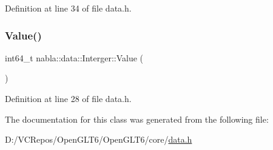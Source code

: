 Definition at line 34 of file data.\+h.

\mbox{\label{classnabla_1_1data_1_1_interger_a3bbd8bd6b1e1815820e91624ec3e8b15}} 
\subsubsection{\texorpdfstring{Value()}{Value()}}
{\footnotesize\ttfamily int64\+\_\+t nabla\+::data\+::\+Interger\+::\+Value (\begin{DoxyParamCaption}{ }\end{DoxyParamCaption})\hspace{0.3cm}{\ttfamily [inline]}}



Definition at line 28 of file data.\+h.



The documentation for this class was generated from the following file\+:\begin{DoxyCompactItemize}
\item 
D\+:/\+V\+C\+Repos/\+Open\+G\+L\+T6/\+Open\+G\+L\+T6/core/\mbox{\hyperlink{data_8h}{data.\+h}}\end{DoxyCompactItemize}

